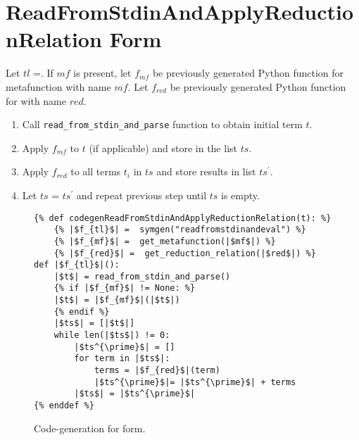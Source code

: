 \section{ReadFromStdinAndApplyReductionRelation Form}

Let $tl$ =\ReadFromStdinAndApplyReductionRelation. If $mf$ is present, let $f_{mf}$ be previously generated Python function for metafunction with name $mf$. Let $f_{red}$ be previously generated Python function for \RedexMatchAssertEqualNoArgs \space with name $red$. 

\begin{enumerate}
\item Call \texttt{read\_from\_stdin\_and\_parse} function to obtain initial term $t$.
\item Apply $f_{mf}$ to $t$ (if applicable) and store in the list $ts$.
\item Apply $f_{red}$ to all terms $t_i$ in $ts$ and store results in list $ts^{\prime}$.
\item Let $ts$ = $ts^{\prime}$ and repeat previous step until $ts$ is empty.
\end{enumerate}

\begin{figure}
\begin{verbatim}
{% def codegenReadFromStdinAndApplyReductionRelation(t): %}
	{% |$f_{tl}$| =  symgen("readfromstdinandeval") %}
	{% |$f_{mf}$| =  get_metafunction(|$mf$|) %}
	{% |$f_{red}$| =  get_reduction_relation(|$red$|) %}
def |$f_{tl}$|():
	|$t$| = read_from_stdin_and_parse()
	{% if |$f_{mf}$| != None: %}
	|$t$| = |$f_{mf}$|(|$t$|)
	{% endif %}
    |$ts$| = [|$t$|]
    while len(|$ts$|) != 0:
        |$ts^{\prime}$| = []
        for term in |$ts$|:
            terms = |$f_{red}$|(term)
            |$ts^{\prime}$|= |$ts^{\prime}$| + terms 
        |$ts$| = |$ts^{\prime}$|
{% enddef %}
\end{verbatim}
\caption{Code-generation for \ReadFromStdinAndApplyReductionRelationNoArgs form.}
\label{codegen-repl}
\end{figure}
